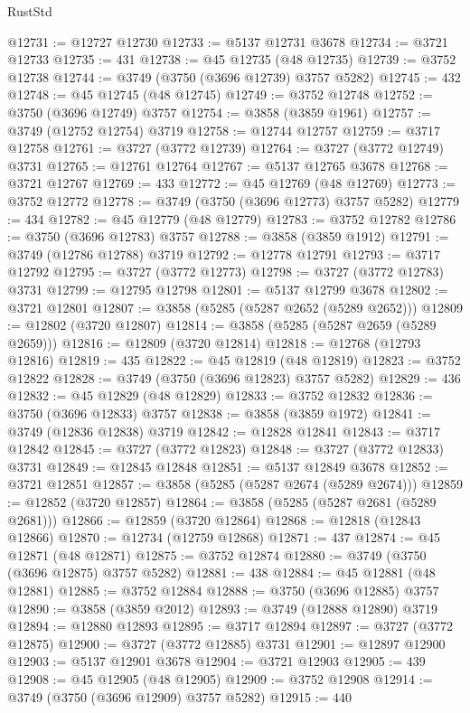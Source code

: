 \begin{lexlean}{RustStd}
\begin{coremodule}
@12731 := @12727 @12730
@12733 := @5137 @12731 @3678
@12734 := @3721 @12733
@12735 := 431
@12738 := @45 @12735 (@48 @12735)
@12739 := @3752 @12738
@12744 := @3749 (@3750 (@3696 @12739) @3757 @5282)
@12745 := 432
@12748 := @45 @12745 (@48 @12745)
@12749 := @3752 @12748
@12752 := @3750 (@3696 @12749) @3757
@12754 := @3858 (@3859 @1961)
@12757 := @3749 (@12752 @12754) @3719
@12758 := @12744 @12757
@12759 := @3717 @12758
@12761 := @3727 (@3772 @12739)
@12764 := @3727 (@3772 @12749) @3731
@12765 := @12761 @12764
@12767 := @5137 @12765 @3678
@12768 := @3721 @12767
@12769 := 433
@12772 := @45 @12769 (@48 @12769)
@12773 := @3752 @12772
@12778 := @3749 (@3750 (@3696 @12773) @3757 @5282)
@12779 := 434
@12782 := @45 @12779 (@48 @12779)
@12783 := @3752 @12782
@12786 := @3750 (@3696 @12783) @3757
@12788 := @3858 (@3859 @1912)
@12791 := @3749 (@12786 @12788) @3719
@12792 := @12778 @12791
@12793 := @3717 @12792
@12795 := @3727 (@3772 @12773)
@12798 := @3727 (@3772 @12783) @3731
@12799 := @12795 @12798
@12801 := @5137 @12799 @3678
@12802 := @3721 @12801
@12807 := @3858 (@5285 (@5287 @2652 (@5289 @2652)))
@12809 := @12802 (@3720 @12807)
@12814 := @3858 (@5285 (@5287 @2659 (@5289 @2659)))
@12816 := @12809 (@3720 @12814)
@12818 := @12768 (@12793 @12816)
@12819 := 435
@12822 := @45 @12819 (@48 @12819)
@12823 := @3752 @12822
@12828 := @3749 (@3750 (@3696 @12823) @3757 @5282)
@12829 := 436
@12832 := @45 @12829 (@48 @12829)
@12833 := @3752 @12832
@12836 := @3750 (@3696 @12833) @3757
@12838 := @3858 (@3859 @1972)
@12841 := @3749 (@12836 @12838) @3719
@12842 := @12828 @12841
@12843 := @3717 @12842
@12845 := @3727 (@3772 @12823)
@12848 := @3727 (@3772 @12833) @3731
@12849 := @12845 @12848
@12851 := @5137 @12849 @3678
@12852 := @3721 @12851
@12857 := @3858 (@5285 (@5287 @2674 (@5289 @2674)))
@12859 := @12852 (@3720 @12857)
@12864 := @3858 (@5285 (@5287 @2681 (@5289 @2681)))
@12866 := @12859 (@3720 @12864)
@12868 := @12818 (@12843 @12866)
@12870 := @12734 (@12759 @12868)
@12871 := 437
@12874 := @45 @12871 (@48 @12871)
@12875 := @3752 @12874
@12880 := @3749 (@3750 (@3696 @12875) @3757 @5282)
@12881 := 438
@12884 := @45 @12881 (@48 @12881)
@12885 := @3752 @12884
@12888 := @3750 (@3696 @12885) @3757
@12890 := @3858 (@3859 @2012)
@12893 := @3749 (@12888 @12890) @3719
@12894 := @12880 @12893
@12895 := @3717 @12894
@12897 := @3727 (@3772 @12875)
@12900 := @3727 (@3772 @12885) @3731
@12901 := @12897 @12900
@12903 := @5137 @12901 @3678
@12904 := @3721 @12903
@12905 := 439
@12908 := @45 @12905 (@48 @12905)
@12909 := @3752 @12908
@12914 := @3749 (@3750 (@3696 @12909) @3757 @5282)
@12915 := 440

\end{coremodule}
\end{lexlean}
